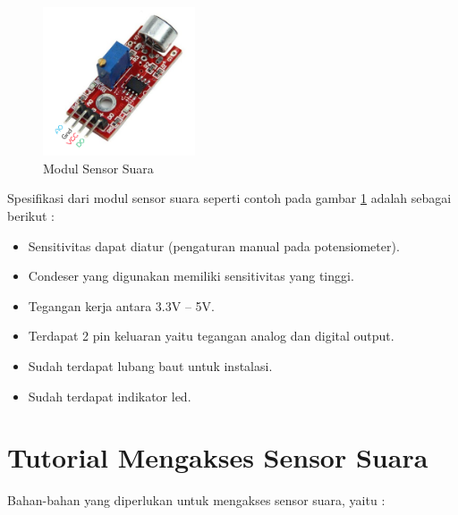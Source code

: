 \begin{figure}[ht]
\centerline{\includegraphics[width=0.4\textwidth]{figures/sssensorsuara.png}}
\caption{Modul Sensor Suara}
\label{sssensorsuara}
\end{figure}
	
Spesifikasi dari modul sensor suara seperti contoh pada gambar \ref{sssensorsuara} adalah sebagai berikut :

\begin{itemize}
\item Sensitivitas dapat diatur (pengaturan manual pada potensiometer).
\item Condeser yang digunakan memiliki sensitivitas yang tinggi.
\item Tegangan kerja antara 3.3V – 5V.
\item Terdapat 2 pin keluaran yaitu tegangan analog dan digital output.
\item Sudah terdapat lubang baut untuk instalasi.
\item Sudah terdapat indikator led.
\end{itemize}

\section{Tutorial Mengakses Sensor Suara}

\hspace{4mm} Bahan-bahan yang diperlukan untuk mengakses sensor suara, yaitu :

